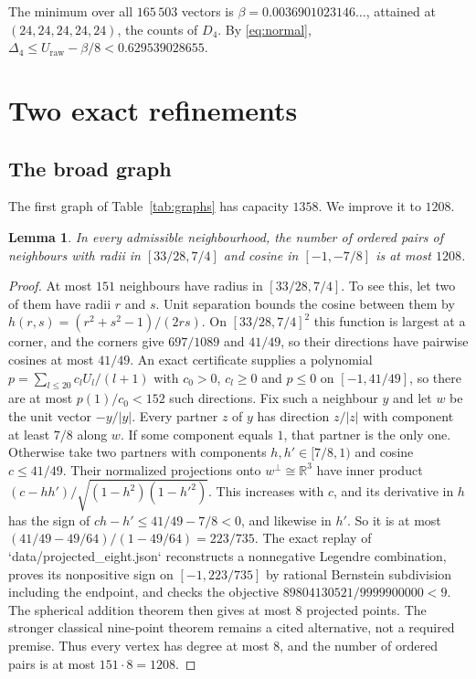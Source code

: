 \documentclass[11pt]{amsart}
\numberwithin{equation}{section}
\newtheorem{lemma}[theorem]{Lemma}
\theoremstyle{remark}
\newcommand{\R}{\mathbb{R}}
\begin{document}
The minimum over all $165\,503$ vectors is $\beta=0.0036901023146\ldots$, attained at $(24,24,24,24,24)$, the counts of $D_4$. By \eqref{eq:normal}, $\Delta_4\le U_{\mathrm{raw}}-\beta/8<0.629539028655$.

\section{Two exact refinements}\label{sec:refine}

\subsection*{The broad graph}
The first graph of Table~\ref{tab:graphs} has capacity $1358$. We improve it to $1208$.

\begin{lemma}\label{lem:1208}
In every admissible neighbourhood, the number of ordered pairs of neighbours with radii in $[33/28,7/4]$ and cosine in $[-1,-7/8]$ is at most $1208$.
\end{lemma}

\begin{proof}
At most $151$ neighbours have radius in $[33/28,7/4]$. To see this, let two of them have radii $r$ and $s$. Unit separation bounds the cosine between them by $h(r,s)=(r^2+s^2-1)/(2rs)$. On $[33/28,7/4]^2$ this function is largest at a corner, and the corners give $697/1089$ and $41/49$, so their directions have pairwise cosines at most $41/49$. An exact certificate supplies a polynomial $p=\sum_{l\le20}c_lU_l/(l+1)$ with $c_0>0$, $c_l\ge0$ and $p\le0$ on $[-1,41/49]$, so there are at most $p(1)/c_0<152$ such directions. Fix such a neighbour $y$ and let $w$ be the unit vector $-y/|y|$. Every partner $z$ of $y$ has direction $z/|z|$ with component at least $7/8$ along $w$. If some component equals $1$, that partner is the only one. Otherwise take two partners with components $h,h'\in[7/8,1)$ and cosine $c\le41/49$. Their normalized projections onto $w^\perp\cong\R^3$ have inner product $(c-hh')/\sqrt{(1-h^2)(1-h'^2)}$. This increases with $c$, and its derivative in $h$ has the sign of $ch-h'\le41/49-7/8<0$, and likewise in $h'$. So it is at most $(41/49-49/64)/(1-49/64)=223/735$. The exact replay of `data/projected_eight.json` reconstructs a nonnegative Legendre combination, proves its nonpositive sign on $[-1,223/735]$ by rational Bernstein subdivision including the endpoint, and checks the objective $89804130521/9999900000<9$. The spherical addition theorem then gives at most $8$ projected points. The stronger classical nine-point theorem \cite{SvdW,BM} remains a cited alternative, not a required premise. Thus every vertex has degree at most $8$, and the number of ordered pairs is at most $151\cdot8=1208$.
\end{proof}
\end{document}
